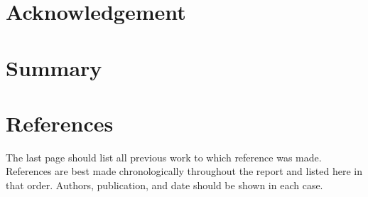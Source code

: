 

\titleGM
\pagestyle{empty}

\clearpage


\doublespacing
\section*{Acknowledgement}
\newpage

\section*{Summary}
\newpage

\pagestyle{plain}
\setcounter{page}{1}
\tableofcontents
\newpage

\listoffigures
\newpage

\listoftables
\newpage

\setcounter{page}{1}




\newpage


\newpage


\newpage

\section*{References}
The last page should list all previous work to which reference was made.
References are best made chronologically throughout the report and listed here in that order.
Authors, publication, and date should be shown in each case.
